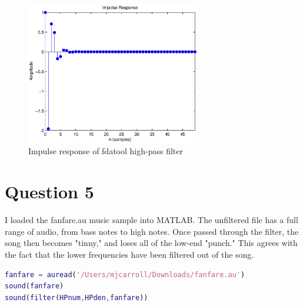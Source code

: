 \documentclass{article}
\begin{document}
\begin{figure}[htp]
	\begin{center}
		\includegraphics [width=3.0in]{impresp.eps}
		\caption{Impulse response of fdatool high-pass filter}
		\label{fig:figure7}
	\end{center}
\end{figure}

\section*{Question 5}
\begin{par}
I loaded the fanfare.au music sample into MATLAB.  The unfiltered file has a full range of audio, from bass notes to high notes.  Once passed through the filter, the song then becomes "tinny," and loses all of the low-end "punch."  This agrees with the fact that the lower frequencies have been filtered out of the song.
\end{par}
\begin{lstlisting}[language=matlab]
fanfare = auread('/Users/mjcarroll/Downloads/fanfare.au')
sound(fanfare)
sound(filter(HPnum,HPden,fanfare))
\end{lstlisting}
\end{document}
